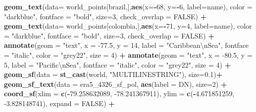 \documentclass[12pt,twoside]{reedthesis}
\newenvironment{Shaded}{\begin{snugshade}}{\end{snugshade}}
\newcommand{\CharTok}[1]{\textcolor[rgb]{0.31,0.60,0.02}{#1}}
\newcommand{\DataTypeTok}[1]{\textcolor[rgb]{0.13,0.29,0.53}{#1}}
\newcommand{\DecValTok}[1]{\textcolor[rgb]{0.00,0.00,0.81}{#1}}
\newcommand{\FloatTok}[1]{\textcolor[rgb]{0.00,0.00,0.81}{#1}}
\newcommand{\KeywordTok}[1]{\textcolor[rgb]{0.13,0.29,0.53}{\textbf{#1}}}
\newcommand{\NormalTok}[1]{#1}
\newcommand{\OperatorTok}[1]{\textcolor[rgb]{0.81,0.36,0.00}{\textbf{#1}}}
\newcommand{\OtherTok}[1]{\textcolor[rgb]{0.56,0.35,0.01}{#1}}
\newcommand{\StringTok}[1]{\textcolor[rgb]{0.31,0.60,0.02}{#1}}
\begin{document}
\begin{Shaded}
\begin{Highlighting}[]
\StringTok{  }\KeywordTok{geom_text}\NormalTok{(}\DataTypeTok{data=}\NormalTok{ world_points[brazil,],}\KeywordTok{aes}\NormalTok{(}\DataTypeTok{x=}\OperatorTok{-}\DecValTok{68}\NormalTok{, }\DataTypeTok{y=}\OperatorTok{-}\DecValTok{6}\NormalTok{, }\DataTypeTok{label=}\NormalTok{name), }\DataTypeTok{color =} \StringTok{"darkblue"}\NormalTok{, }\DataTypeTok{fontface =} \StringTok{"bold"}\NormalTok{, }\DataTypeTok{size=}\DecValTok{3}\NormalTok{, }\DataTypeTok{check_overlap =} \OtherTok{FALSE}\NormalTok{) }\OperatorTok{+}
\StringTok{  }\KeywordTok{geom_text}\NormalTok{(}\DataTypeTok{data=}\NormalTok{ world_points[colombia,],}\KeywordTok{aes}\NormalTok{(}\DataTypeTok{x=}\OperatorTok{-}\DecValTok{71}\NormalTok{, }\DataTypeTok{y=}\DecValTok{4}\NormalTok{, }\DataTypeTok{label=}\NormalTok{name), }\DataTypeTok{color =} \StringTok{"darkblue"}\NormalTok{, }\DataTypeTok{fontface =} \StringTok{"bold"}\NormalTok{, }\DataTypeTok{size=}\DecValTok{3}\NormalTok{, }\DataTypeTok{check_overlap =} \OtherTok{FALSE}\NormalTok{) }\OperatorTok{+}
\StringTok{  }\KeywordTok{annotate}\NormalTok{(}\DataTypeTok{geom =} \StringTok{"text"}\NormalTok{, }\DataTypeTok{x =} \FloatTok{-77.5}\NormalTok{, }\DataTypeTok{y =} \DecValTok{14}\NormalTok{, }\DataTypeTok{label =} \StringTok{"Caribbean}\CharTok{\textbackslash{}n}\StringTok{Sea"}\NormalTok{, }\DataTypeTok{fontface =} \StringTok{"italic"}\NormalTok{, }\DataTypeTok{color =} \StringTok{"grey22"}\NormalTok{, }\DataTypeTok{size =} \DecValTok{4}\NormalTok{) }\OperatorTok{+}\StringTok{ }
\StringTok{  }\KeywordTok{annotate}\NormalTok{(}\DataTypeTok{geom =} \StringTok{"text"}\NormalTok{, }\DataTypeTok{x =} \FloatTok{-80.5}\NormalTok{, }\DataTypeTok{y =} \DecValTok{5}\NormalTok{, }\DataTypeTok{label =} \StringTok{"Pacific}\CharTok{\textbackslash{}n}\StringTok{Sea"}\NormalTok{, }\DataTypeTok{fontface =} \StringTok{"italic"}\NormalTok{, }\DataTypeTok{color =} \StringTok{"grey22"}\NormalTok{, }\DataTypeTok{size =} \DecValTok{4}\NormalTok{) }\OperatorTok{+}
\StringTok{  }\KeywordTok{geom_sf}\NormalTok{(}\DataTypeTok{data =} \KeywordTok{st_cast}\NormalTok{(world, }\StringTok{"MULTILINESTRING"}\NormalTok{),  }\DataTypeTok{size=}\FloatTok{0.1}\NormalTok{)}\OperatorTok{+}
\StringTok{  }\KeywordTok{geom_sf_text}\NormalTok{(}\DataTypeTok{data =}\NormalTok{ era5_}\DecValTok{4326}\NormalTok{_sf_pol, }\KeywordTok{aes}\NormalTok{(}\DataTypeTok{label =}\NormalTok{ DN), }\DataTypeTok{size=}\DecValTok{2}\NormalTok{) }\OperatorTok{+}
\StringTok{  }\KeywordTok{coord_sf}\NormalTok{(}\DataTypeTok{xlim =} \KeywordTok{c}\NormalTok{(}\OperatorTok{-}\FloatTok{79.258632089}\NormalTok{, }\FloatTok{-78.241367911}\NormalTok{), }\DataTypeTok{ylim =} \KeywordTok{c}\NormalTok{(}\OperatorTok{-}\FloatTok{4.671851259}\NormalTok{, }\FloatTok{-3.828148741}\NormalTok{), }\DataTypeTok{expand =} \OtherTok{FALSE}\NormalTok{) }\OperatorTok{+}

\end{Highlighting}
\end{Shaded}
\end{document}
